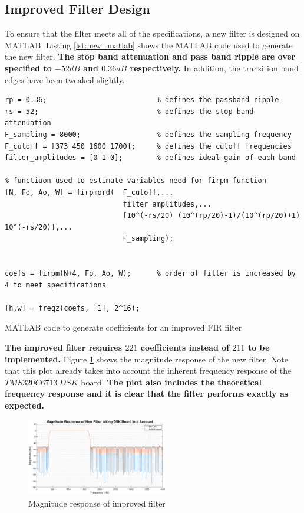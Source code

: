 \documentclass{article}
\begin{document}
\subsection{Improved Filter Design}
To ensure that the filter meets all of the specifications, a new filter is designed on MATLAB. Listing \ref{lst:new_matlab} shows the MATLAB code used to generate the new filter. \textbf{The stop band attenuation and pass band ripple are over specified to $-52dB$ and $0.36dB$ respectively.} In addition, the transition band edges have been tweaked slightly. 

\begin{listing}[H]
\begin{verbatim}
rp = 0.36;                          % defines the passband ripple
rs = 52;                            % defines the stop band attenuation
F_sampling = 8000;                  % defines the sampling frequency
F_cutoff = [373 450 1600 1700];     % defines the cutoff frequencies
filter_amplitudes = [0 1 0];        % defines ideal gain of each band

% functiuon used to estimate variables need for firpm function
[N, Fo, Ao, W] = firpmord(  F_cutoff,...
                            filter_amplitudes,...
                            [10^(-rs/20) (10^(rp/20)-1)/(10^(rp/20)+1) 10^(-rs/20)],...
                            F_sampling);

                        
coefs = firpm(N+4, Fo, Ao, W);      % order of filter is increased by 4 to meet specifications

[h,w] = freqz(coefs, [1], 2^16);
\end{verbatim}
\caption{MATLAB code to generate coefficients for an improved FIR filter} 
\label{lst:new_matlab}
\end{listing}

\textbf{The improved filter requires $221$ coefficients instead of $211$ to be implemented.} Figure \ref{fig:new_filer} shows the magnitude response of the new filter. Note that this plot already takes into account the inherent frequency response of the $TMS320C6713 \ DSK$ board. \textbf{The plot also includes the theoretical frequency response and it is clear that the filter performs exactly as expected.}

\begin{figure}[H]
    \centering
    \includegraphics[width=0.55\textwidth]{dsk_mag_new_filter_after_subtracting}
    \caption{Magnitude response of improved filter}
    \label{fig:new_filer}
\end{figure}
\end{document}
